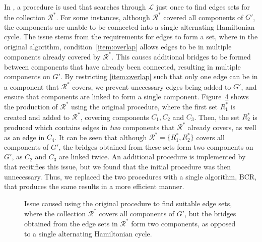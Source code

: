 \documentclass[authoryear]{elsarticle}
\begin{document}
\noindent In \citet{becker2010}, a procedure is used that searches through $\mathcal{L}$ just once to find edges sets for the collection $\mathcal{R}^*$. For some instances, although $\mathcal{R}^*$ covered all components of $G'$, the components are unable to be connected into a single alternating Hamiltonian cycle. The issue stems from the requirements for edges to form a set, where in the original algorithm, condition~\ref{item:overlap} allows edges to be in multiple components already covered by $\mathcal{R}^*$. This causes additional bridges to be formed between components that have already been connected, resulting in multiple components on $G'$. By restricting \ref{item:overlap} such that only one edge can be in a component that $\mathcal{R}^*$ covers, we prevent unecessary edges being added to $G'$, and ensure that components are linked to form a single component. Figure~\ref{fig:overlaperror} shows the production of $\mathcal{R}^*$ using the original procedure, where the first set $R^*_1$ is created and added to $\mathcal{R}^*$, covering components $C_1, C_2$ and $C_3$. Then, the set $R^*_2$ is produced which contains edges in \emph{two} components that $\mathcal{R}^*$ already covers, as well as an edge in $C_4$. It can be seen that although $\mathcal{R}^* = \{R^*_1, R^*_2\}$ covers all components of $G'$, the bridges obtained from these sets form two components on $G'$, as $C_2$ and $C_3$ are linked twice. An additional procedure is implemented by \citet{hawa2018} that recitifies this issue, but we found that the initial procedure was then unnecessary. Thus, we replaced the two procedures with a single algorithm, BCR, that produces the same results in a more efficient manner. 

\begin{figure}[H]
	\centering	
	\begin{subfigure}[h]{0.35\textwidth}
		
		\caption{}
		\label{fig:bcrerror}
	\end{subfigure} \hspace{5mm}
	\begin{subfigure}[h]{0.25\textwidth}
		
		\caption{}
		\label{fig:mpsconnecterror}
	\end{subfigure} \hspace{5mm}
	\begin{subfigure}[h]{0.25\textwidth}
		
		\caption{}
		\label{fig:mpscycleerror}
	\end{subfigure}
	\caption{Issue caused using the original procedure to find suitable edge sets, where the collection $\mathcal{R}^*$ covers all components of $G'$, but the bridges obtained from the edge sets in $\mathcal{R}^*$ form two components, as opposed to a single alternating Hamiltonian cycle.}	
	\label{fig:overlaperror}
\end{figure}
\end{document}
